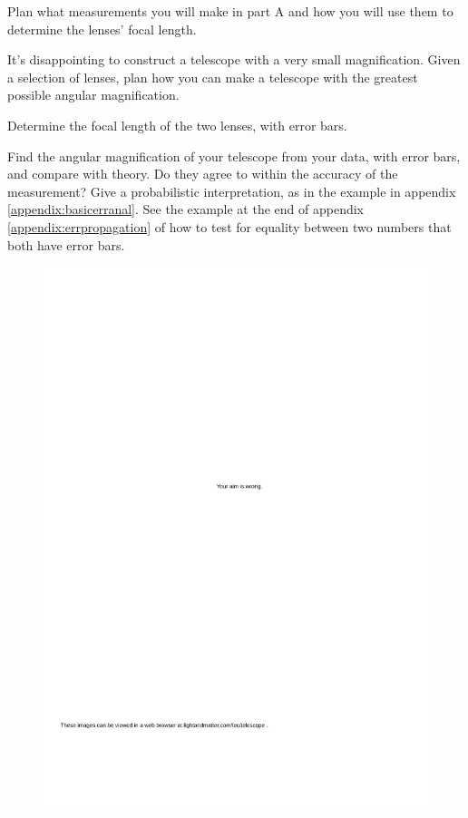 \prelabquestion  Plan what measurements you will make in part A and how
you will use them to determine the lenses' focal length.

\prelabquestion
It's disappointing to construct a telescope with
a very small magnification. Given a selection of lenses, plan
how you can make a telescope with the greatest possible
angular magnification.

\analysis

Determine the focal length of the two lenses, with error bars.

Find the angular magnification of your telescope from your
data, with error bars, and compare with theory. Do they
agree to within the accuracy of the measurement?
Give a probabilistic interpretation, as in the example
in appendix \ref{appendix:basicerranal}.
See the example at the end of appendix \ref{appendix:errpropagation} of how to
test for equality between two numbers that both have error bars.

\pagebreak

\begin{figure}
  \includegraphics{../figs/op-geo-terrier}\label{fig:telescope-terrier}
\end{figure}
